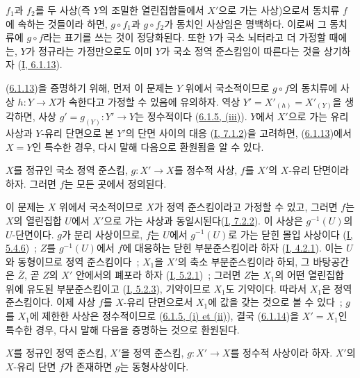 $f_1$과 $f_2$를 두 사상(즉 $Y$의 조밀한 열린집합들에서 $X'$으로
가는 사상)으로서 동치류 $f$에 속하는 것들이라 하면, $g\circ f_1$과
$g\circ f_2$가 동치인
사상임은 명백하다. 이로써 그 동치류에 $g\circ f$라는 표기를 쓰는 것이
정당화된다. 또한 $Y$가 국소 뇌터라고 더 가정할 때에는, $Y$가 정규라는
가정만으로도 이미 $Y$가 국소 정역 준스킴임이 따른다는 것을 상기하자
(\hyperref[I.6.1.13-ko]{I, 6.1.13}).

(\hyperref[II.6.1.13-ko]{6.1.13})을 증명하기 위해, 먼저 이 문제는 $Y$
위에서 국소적이므로 $g\circ f$의 동치류에 사상 $h:Y\to X$가 속한다고
가정할 수 있음에 유의하자. 역상
$Y'=X'_{(h)}=X'_{(Y)}$을 생각하면, 사상
$g'=g_{(Y)}:Y'\to Y$는 정수적이다
(\hyperref[II.6.1.5-ko]{6.1.5, (iii)}). $Y$에서 $X'$으로 가는 유리
사상과 $Y$-유리 단면으로 본 $Y'$의 단면 사이의 대응
(\hyperref[I.7.1.2-ko]{I, 7.1.2})을 고려하면,
(\hyperref[II.6.1.13-ko]{6.1.13})에서 $X=Y$인 특수한 경우, 다시 말해 다음으로
환원됨을 알 수 있다.

\begin{corollary}[6.1.14]
\label{II.6.1.14-ko}
$X$를 정규인 국소 정역 준스킴, $g:X'\to X$를 정수적 사상, $f$를
$X'$의 $X$-유리 단면이라 하자. 그러면 $f$는 모든 곳에서 정의된다.
\end{corollary}

이 문제는 $X$ 위에서 국소적이므로 $X$가 정역 준스킴이라고 가정할 수
있고, 그러면 $f$는 $X$의 열린집합 $U$에서 $X'$으로 가는 사상과
동일시된다(\hyperref[I.7.2.2-ko]{I, 7.2.2}). 이 사상은
$g^{-1}(U)$의 $U$-단면이다. $g$가 분리 사상이므로, $f$는 $U$에서
$g^{-1}(U)$로 가는 닫힌 몰입 사상이다
(\hyperref[I.5.4.6-ko]{I, 5.4.6})~; $Z$를 $g^{-1}(U)$에서 $f$에 대응하는
닫힌 부분준스킴이라 하자
(\hyperref[I.4.2.1-ko]{I, 4.2.1}). 이는 $U$와 동형이므로 정역
준스킴이다~; $X_1$을 $X'$의 축소 부분준스킴이라 하되, 그 바탕공간은
$\overline{Z}$, 곧 $Z$의 $X'$ 안에서의 폐포라 하자
(\hyperref[I.5.2.1-ko]{I, 5.2.1})~; 그러면 $Z$는 $X_1$의 어떤
열린집합 위에 유도된 부분준스킴이고
(\hyperref[I.5.2.3-ko]{I, 5.2.3}), 기약이므로 $X_1$도 기약이다. 따라서
$X_1$은 정역 준스킴이다. 이제 사상 $f$를 $X$-유리 단면으로서 $X_1$에
값을 갖는 것으로 볼 수 있다~; $g$를 $X_1$에 제한한 사상은 정수적이므로
(\hyperref[II.6.1.5-ko]{6.1.5, (i) et (ii)}), 결국
(\hyperref[II.6.1.14-ko]{6.1.14})을 $X'=X_1$인 특수한 경우, 다시 말해
다음을 증명하는 것으로 환원된다.

\begin{corollary}[6.1.15]
\label{II.6.1.15-ko}
$X$를 정규인 정역 준스킴, $X'$을 정역 준스킴,
$g:X'\to X$를 정수적 사상이라 하자. $X'$의 $X$-유리 단면 $f$가
존재하면 $g$는 동형사상이다.
\end{corollary}

